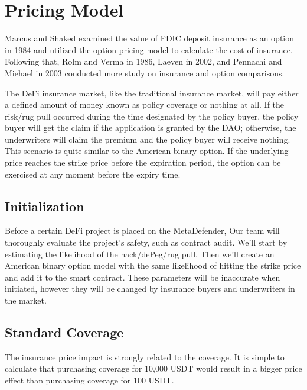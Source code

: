 \documentclass[10pt, a4paper, twocolumn]{article} %
\begin{document}

\section{Pricing Model}\label{sec:pricing-model}

Marcus and Shaked examined the value of FDIC deposit insurance as an option in 1984 and utilized the option pricing model to calculate the cost of insurance.
Following that, Rolm and Verma in 1986, Laeven in 2002, and Pennachi and Miehael in 2003 conducted more study on insurance and option comparisons.

The DeFi insurance market, like the traditional insurance market, will pay either a defined amount of money known as policy coverage or nothing at all.
If the risk/rug pull occurred during the time designated by the policy buyer, the policy buyer will get the claim if the application is granted by the DAO; otherwise, the underwriters will claim the premium and the policy buyer will receive nothing.
This scenario is quite similar to the American binary option.
If the underlying price reaches the strike price before the expiration period, the option can be exercised at any moment before the expiry time.

\subsection{Initialization}\label{subsec:initialization}

Before a certain DeFi project is placed on the MetaDefender, Our team will thoroughly evaluate the project's safety, such as contract audit.
We'll start by estimating the likelihood of the hack/dePeg/rug pull.
Then we'll create an American binary option model with the same likelihood of hitting the strike price and add it to the smart contract.
These parameters will be inaccurate when initiated, however they will be changed by insurance buyers and underwriters in the market.

\subsection{Standard Coverage}\label{subsec:standard-coverage}

The insurance price impact is strongly related to the coverage.
It is simple to calculate that purchasing coverage for 10,000 USDT would result in a bigger price effect than purchasing coverage for 100 USDT.
\end{document}
